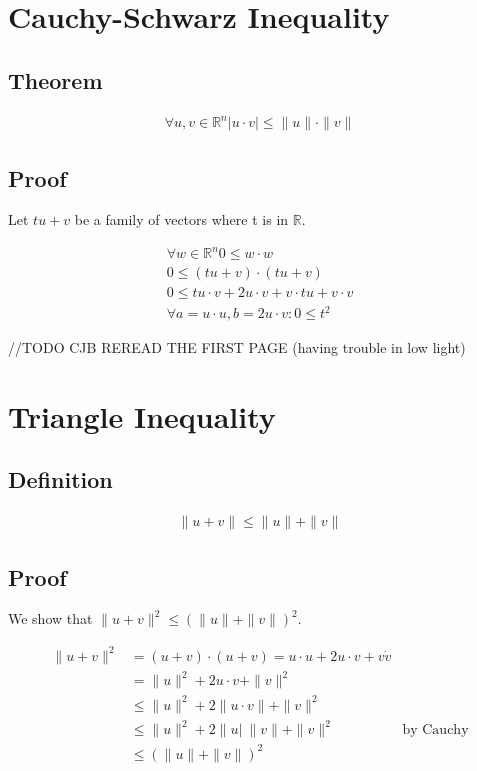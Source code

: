 \section{Cauchy-Schwarz Inequality}

	\subsection{Theorem}
		\begin{align}
			\forall u, v \in \mathbb{R}^n |u \cdot v| \leq \|u\| \cdot \|v\|
		\end{align}
  
	\subsection{Proof}
	
		Let $tu + v$ be a family of vectors where t is in $\mathbb{R}$.
	
		\begin{align}
			\forall w \in \mathbb{R}^n 0 \leq w \cdot w \\
			0 \leq (tu + v) \cdot (tu + v) \\
			0 \leq tu \cdot v  + 2u \cdot v + v \cdot tu + v \cdot v \\
			\forall a = u \cdot u, b = 2u \cdot v: 0 \leq t^2
		\end{align}
		
	//TODO CJB REREAD THE FIRST PAGE (having trouble in low light)
		
\section{Triangle Inequality}

	\subsection{Definition}
	
		\begin{align}
			\|u+v\| \leq \|u\| + \|v\|
		\end{align}
		
	\subsection{Proof}
	
		We show that $\|u+v\|^2 \leq (\|u\| + \|v\|)^2$.
		
		\begin{align}
			\|u+v\|^2 &= (u+v) \cdot (u+v) = u \cdot u + 2u \cdot v + v \dot v \\
				&= \|u\|^2 + 2u \cdot v + \|v\|^2 \\
				&\leq \|u\|^2 + 2\|u \cdot v \| + \|v\|^2  \\
				&\leq \|u\|^2 + 2\|u|\ \|v\| + \|v\|^2 & \textrm{by Cauchy} \\
				&\leq (\|u\| + \|v\|)^2
		\end{align}
		
